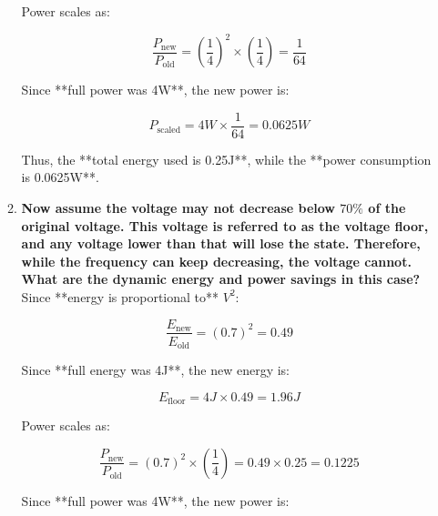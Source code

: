 \begin{enumerate}
\begin{enumerate}
                    Power scales as:

                    \begin{equation*}
                        \frac{P_{\text{new}}}{P_{\text{old}}} = \left(\frac{1}{4}\right)^2 \times \left(\frac{1}{4}\right) = \frac{1}{64}
                    \end{equation*}

                    Since **full power was 4W**, the new power is:

                    \begin{equation*}
                        P_{\text{scaled}} = 4W \times \frac{1}{64} = 0.0625W
                    \end{equation*}

                    Thus, the **total energy used is 0.25J**, while the **power consumption is 0.0625W**.

              \item \textbf{Now assume the voltage may not decrease below $70\%$ of the original voltage. This voltage is referred to as the voltage floor, and any voltage lower than that will lose the state. Therefore, while the frequency can keep decreasing, the voltage cannot. What are the dynamic energy and power savings in this case?} \\

                    Since **energy is proportional to** $V^2$:

                    \begin{equation*}
                        \frac{E_{\text{new}}}{E_{\text{old}}} = (0.7)^2 = 0.49
                    \end{equation*}

                    Since **full energy was 4J**, the new energy is:

                    \begin{equation*}
                        E_{\text{floor}} = 4J \times 0.49 = 1.96J
                    \end{equation*}

                    Power scales as:

                    \begin{equation*}
                        \frac{P_{\text{new}}}{P_{\text{old}}} = (0.7)^2 \times \left(\frac{1}{4}\right) = 0.49 \times 0.25 = 0.1225
                    \end{equation*}

                    Since **full power was 4W**, the new power is:


\end{enumerate}
\end{enumerate}
